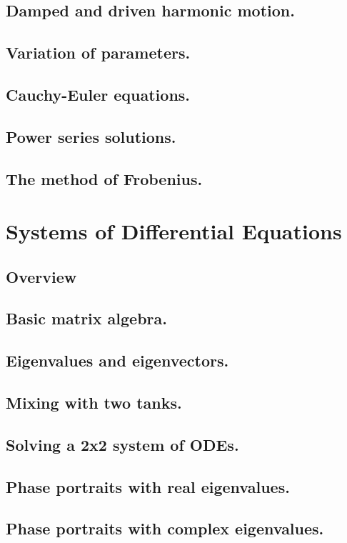 \documentclass{article}
\begin{document}
\subsection{Damped and driven harmonic motion.}
\subsection{Variation of parameters.}
\subsection{Cauchy-Euler equations.}
\subsection{Power series solutions.}
\subsection{The method of Frobenius.}

\pagebreak

\section{Systems of Differential Equations}
\subsection*{Overview}

\subsection{Basic matrix algebra.}
\subsection{Eigenvalues and eigenvectors.}
\subsection{Mixing with two tanks.}
\subsection{Solving a 2x2 system of ODEs.}
\subsection{Phase portraits with real eigenvalues.}
\subsection{Phase portraits with complex eigenvalues.}
\end{document}
